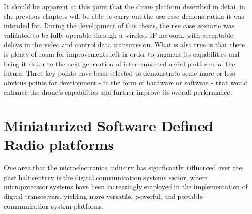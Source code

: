 It should be apparent at this point that the drone platform described in detail in the previous chapters will be able to carry out the use-case demonstration it was intended for. During the development of this thesis, the use case scenario was validated to be fully operable through a wireless IP network, with acceptable delays in the video and control data transmission. What is also true is that there is plenty of room for improvements left in order to augment its capabilities and bring it closer to the next generation of interconnected aerial platforms of the future. Three key points have been selected to demonstrate some more or less obvious points for development - in the form of hardware or software - that would enhance the drone's capabilities and further improve its overall performance. 

\newpage
\section{Miniaturized Software Defined Radio platforms}

One area that the microelectronics industry has significantly influenced over the past half century is the digital communication systems sector, where microprocessor systems have been increasingly employed in the implementation of digital transceivers, yielding more versatile, powerful, and portable communication system platforms.

